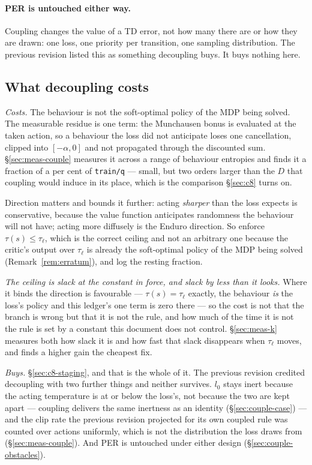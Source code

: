 \documentclass{article}
\begin{document}
\paragraph{PER is untouched either way.} Coupling changes the value of a TD error, not how many
there are or how they are drawn: one loss, one priority per transition, one sampling
distribution. The previous revision listed this as something decoupling buys. It buys nothing
here.

\subsection{What decoupling costs}
\label{sec:decouple-ledger}

\emph{Costs.} The behaviour is not the soft-optimal policy of the MDP being solved. The
measurable residue is one term: the Munchausen bonus is evaluated at the taken action, so a
behaviour the loss did not anticipate loses one cancellation, clipped into $[-\alpha, 0]$ and not
propagated through the discounted sum. \S\ref{sec:meas-couple} measures it across a range of
behaviour entropies and finds it a fraction of a per cent of \texttt{train/q} --- small, but two
orders larger than the $D$ that coupling would induce in its place, which is the comparison
\S\ref{sec:c8} turns on.

Direction matters and bounds it further: acting \emph{sharper} than the loss expects is
conservative, because the value function anticipates randomness the behaviour will not have;
acting more diffusely is the Enduro direction. So enforce $\tau(s) \le \tau_\ell$, which is the
correct ceiling and not an arbitrary one because the critic's output over $\tau_\ell$ is already
the soft-optimal policy of the MDP being solved (Remark~\ref{rem:erratum}), and log the resting
fraction.

\emph{The ceiling is slack at the constant in force, and slack by less than it looks.} Where it
binds the direction is favourable --- $\tau(s) = \tau_\ell$ exactly, the behaviour \emph{is} the
loss's policy and this ledger's one term is zero there --- so the cost is not that the branch is
wrong but that it is not the rule, and how much of the time it is not the rule is set by a
constant this document does not control. \S\ref{sec:meas-k} measures both how slack it is and how
fast that slack disappears when $\tau_\ell$ moves, and finds a higher gain the cheapest fix.

\emph{Buys.} \S\ref{sec:c8-staging}, and that is the whole of it. The previous revision credited
decoupling with two further things and neither survives. $l_0$ stays inert because the acting
temperature is at or below the loss's, not because the two are kept apart --- coupling delivers
the same inertness as an identity (\S\ref{sec:couple-case}) --- and the clip rate the previous
revision projected for its own coupled rule was counted over actions uniformly, which is not the
distribution the loss draws from (\S\ref{sec:meas-couple}). And PER is untouched under either
design (\S\ref{sec:couple-obstacles}).
\end{document}
